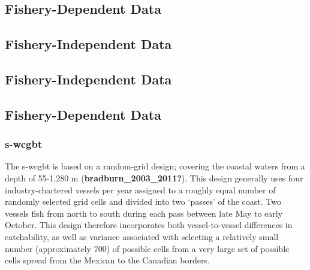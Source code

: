 \documentclass[11pt,
  english,
  a4paper,
]{article}
\begin{document}

\hypertarget{fishery-dependent-data-1}{%
\subsection{Fishery-Dependent Data}\label{fishery-dependent-data-1}}

\leavevmode\tagmcend\tagstructend


\hypertarget{fishery-independent-data}{%
\subsection{Fishery-Independent Data}\label{fishery-independent-data}}

\leavevmode\tagmcend\tagstructend


\hypertarget{fishery-independent-data-1}{%
\subsection{Fishery-Independent Data}\label{fishery-independent-data-1}}

\leavevmode\tagmcend\tagstructend


\hypertarget{fishery-dependent-data-2}{%
\subsection{Fishery-Dependent Data}\label{fishery-dependent-data-2}}

\leavevmode\tagmcend\tagstructend


\hypertarget{section}{%
\subsubsection{\texorpdfstring{\acrlong{s-wcgbt}}{}}\label{section}}

\leavevmode\tagmcend\tagstructend

The \Gls{s-wcgbt} is based on a random-grid design; covering the coastal waters from a depth of 55-1,280 m {(\textbf{bradburn\_2003\_2011?})\leavevmode\tagmcend\tagstructend}. This design generally uses four industry-chartered vessels per year assigned to a roughly equal number of randomly selected grid cells and divided into two `passes' of the coast. Two vessels fish from north to south during each pass between late May to early October. This design therefore incorporates both vessel-to-vessel differences in catchability, as well as variance associated with selecting a relatively small number (approximately 700) of possible cells from a very large set of possible cells spread from the Mexican to the Canadian borders.
\end{document}
